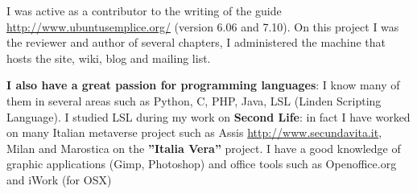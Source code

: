 \documentclass[totpages,helvetica,openbib,english]{europecv}
\begin{document}
\begin{europecv}
{I was active as a contributor to the writing of the guide \url{http://www.ubuntusemplice.org/} (version 6.06 and 7.10). On this project I was the reviewer and author of several chapters, I administered the machine that hosts the site, wiki, blog and mailing list.

\textbf{I also have a great passion for programming languages}: I know many of them in several areas such as Python, C, PHP, Java, LSL (Linden Scripting Language). I studied LSL during my work on \textbf{Second Life}: in fact I have worked on many Italian metaverse project such as Assis \url{http://www.secundavita.it}, Milan and Marostica on the \textbf{''Italia Vera''} project.
I have a good knowledge of graphic applications (Gimp, Photoshop) and office tools such as Openoffice.org and iWork (for OSX)}






\end{europecv}
\end{document}
